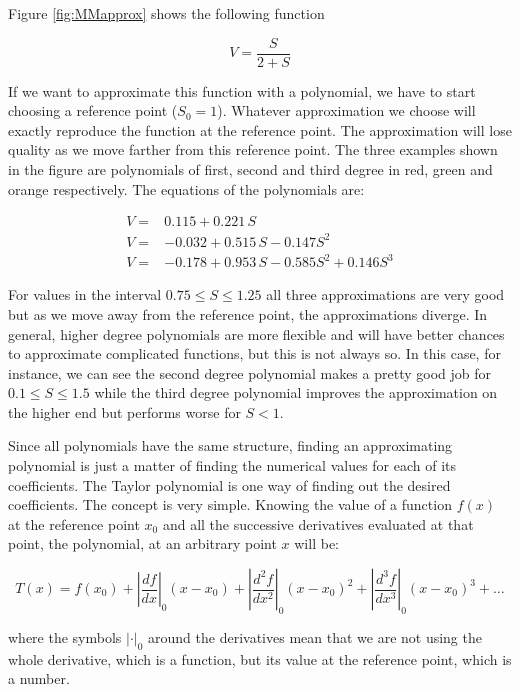 \documentclass[12pt]{article}
\begin{document}
Figure \ref{fig:MMapprox} shows the following function

\begin{equation}
	V=\frac{S}{2+S} \nonumber
\end{equation}

If we want to approximate this function with a polynomial, we have to start choosing a reference point ($S_0=1$). Whatever approximation we choose will exactly reproduce the function at the reference point. The approximation will lose quality as we move farther from this reference point. The three examples shown in the figure are polynomials of first, second and third degree in red, green and orange respectively. The  equations of the polynomials are:

\begin{align}
	V=& 0.115 + 0.221 \, S\nonumber\\
	V=& -0.032 + 0.515 \, S - 0.147 S^2\nonumber\\
	V=& -0.178 + 0.953 \, S- 0.585 S^2+ 0.146 S^3 \nonumber
\end{align}

For values in the interval $0.75 \leq S \leq 1.25$ all three approximations are very good but as we move away from the reference point, the approximations diverge. In general, higher degree polynomials are more flexible and will have better chances to approximate complicated functions, but this is not always so. In this case, for instance, we can see the second degree polynomial makes a pretty good job for $0.1 \leq S \leq 1.5$ while the third degree polynomial improves the approximation on the higher end but performs worse for $S < 1$.

Since all polynomials have the same structure, finding an approximating polynomial is just a matter of finding the numerical values for each of its coefficients. The Taylor polynomial is one way of finding out the desired coefficients. The concept is very simple. Knowing the value of a function $f(x)$ at the reference point $x_0$ and all the successive derivatives evaluated at that point, the polynomial, at an arbitrary point $x$ will be:

\begin{equation}
	T(x)=f(x_0) + \left|\frac{df}{dx}\right|_0 \left( x - x_0\right)+ \left|\frac{d^2f}{dx^2}\right|_0 \left( x - x_0\right)^2+ \left|\frac{d^3f}{dx^3}\right|_0 \left( x - x_0\right)^3+ \dots
	\nonumber
\end{equation}

where the symbols $\left| \cdot \right|_0$ around the derivatives mean that we are not using the whole derivative, which is a function, but its value at the reference point, which is a number.
\end{document}
